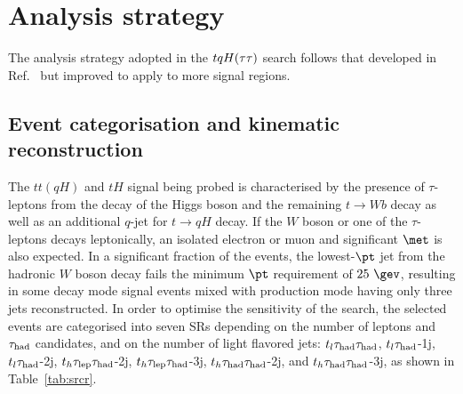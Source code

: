 \section{Analysis strategy}
\label{sec:strategy_Htautau}

The analysis strategy adopted in the $tqH(\tau\tau)$ search follows that developed in Ref.~\cite{Chen:2015nta} but improved to apply to more signal regions.

\subsection{Event categorisation and kinematic reconstruction}
\label{sec:htautau_reco_cat}

The $tt(qH)$ and $tH$ signal being probed is characterised by the presence of $\tau$-leptons from the decay of 
the Higgs boson and the remaining $t\to Wb$ decay as well as an additional $q$-jet for $t\to qH$ decay. 
If the $W$ boson or one of the $\tau$-leptons decays leptonically, an isolated electron or muon and significant $\met$ is also expected.
In a significant fraction of the events, the lowest-$\pt$ jet from the hadronic $W$ boson decay fails the minimum $\pt$ requirement of $25~\gev$,
resulting in some decay mode signal events mixed with production mode having only three jets reconstructed.
In order to optimise the sensitivity of the search, the selected events are categorised into seven SRs depending on the number of leptons and
$\tau_{\mathrm{had}}$ candidates, and on the number of light flavored jets:
$t_l\tau_{\mathrm{had}} \tau_{\mathrm{had}}$, $t_l\tau_{\mathrm{had}}$-1j, $t_l\tau_{\mathrm{had}}$-2j, $t_h\tau_{\mathrm{lep}} \tau_{\mathrm{had}}$-2j, $t_h\tau_{\mathrm{lep}} \tau_{\mathrm{had}}$-3j, $t_h\tau_{\mathrm{had}} \tau_{\mathrm{had}}$-2j, and $t_h\tau_{\mathrm{had}} \tau_{\mathrm{had}}$-3j, as shown in Table~\ref{tab:srcr}. 

